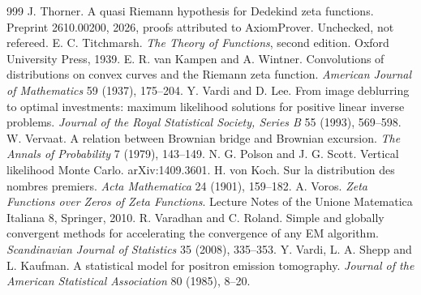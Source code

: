 \begin{thebibliography}{999}
 J. Thorner. A quasi Riemann hypothesis for Dedekind zeta functions. Preprint 2610.00200, 2026, proofs attributed to AxiomProver. Unchecked, not refereed.
 E. C. Titchmarsh. \emph{The Theory of Functions}, second edition. Oxford University Press, 1939.
 E. R. van Kampen and A. Wintner. Convolutions of distributions on convex curves and the Riemann zeta function. \emph{American Journal of Mathematics} 59 (1937), 175--204.
 Y. Vardi and D. Lee. From image deblurring to optimal investments: maximum likelihood solutions for positive linear inverse problems. \emph{Journal of the Royal Statistical Society, Series B} 55 (1993), 569--598.
 W. Vervaat. A relation between Brownian bridge and Brownian excursion. \emph{The Annals of Probability} 7 (1979), 143--149.
 N. G. Polson and J. G. Scott. Vertical likelihood Monte Carlo. arXiv:1409.3601.
 H. von Koch. Sur la distribution des nombres premiers. \emph{Acta Mathematica} 24 (1901), 159--182.
 A. Voros. \emph{Zeta Functions over Zeros of Zeta Functions}. Lecture Notes of the Unione Matematica Italiana 8, Springer, 2010.
 R. Varadhan and C. Roland. Simple and globally convergent methods for accelerating the convergence of any EM algorithm. \emph{Scandinavian Journal of Statistics} 35 (2008), 335--353.
 Y. Vardi, L. A. Shepp and L. Kaufman. A statistical model for positron emission tomography. \emph{Journal of the American Statistical Association} 80 (1985), 8--20.

\end{thebibliography}
